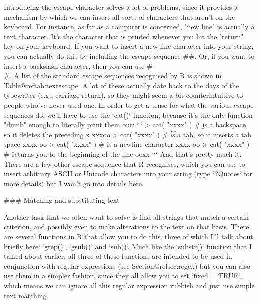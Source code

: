 Introducing the escape character solves a lot of problems, since it provides a mechanism by which we can insert all sorts of characters that aren't on the keyboard. For instance, as far as a computer is concerned, "new line" is actually a text character. It's the character that is printed whenever you hit the "return" key on your keyboard. If you want to insert a new line character into your string, you can actually do this by including the escape sequence \rtextverb#\n#. Or, if you want to insert a backslash character, then you can use \rtextverb#\\#. A list of the standard escape sequences recognised by R is shown in Table@reftab:textescape. A lot of these actually date back to the days of the typewriter (e.g., carriage return), so they might seem a bit counterintuitive to people who've never used one. In order to get a sense for what the various escape sequences do, we'll have to use the `cat()` function, because it's the only function "dumb" enough to literally print them out:
```
> cat( "xxxx\boo" )  # \b is a backspace, so it deletes the preceding x
xxxoo
> cat( "xxxx\too" )  # \t is a tab, so it inserts a tab space
xxxx	oo
> cat( "xxxx\noo" )  # \n is a newline character
xxxx
oo
> cat( "xxxx\roo" )  # \r returns you to the beginning of the line
ooxx
```
And that's pretty much it. There are a few other escape sequence that R recognises, which you can use to insert arbitrary ASCII or Unicode characters into your string (type `?Quotes` for more details) but I won't go into details here.


### Matching and substituting text

Another task that we often want to solve is find all strings that match a certain criterion, and possibly even to make alterations to the text on that basis. There are several functions in R that allow you to do this, three of which I'll talk about briefly here: `grep()`, `gsub()` and `sub()`. Much like the `substr()` function that I talked about earlier, all three of these functions are intended to be used in conjunction with regular expressions (see Section@refsec:regex) but you can also use them in a simpler fashion, since they all allow you to set `fixed = TRUE`, which means we can ignore all this regular expression rubbish and just use simple text matching.


